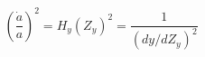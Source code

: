\begin{equation}\label{dify}
(\frac{\dot{a}}{a})^2=H_y(Z_y)^2=\frac{1}{(dy/dZ_y)^2}
\end{equation}

